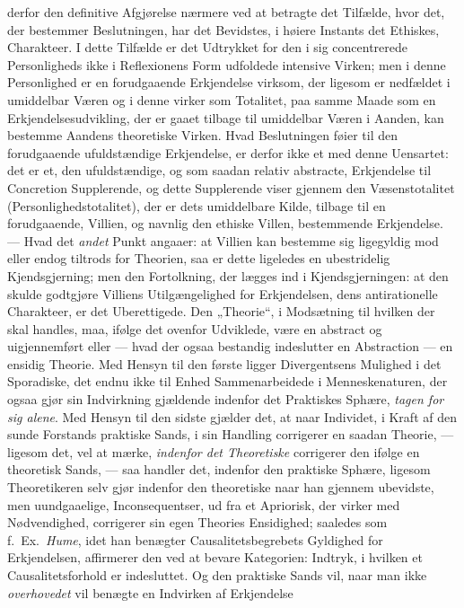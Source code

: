 \documentclass[12pt,a4paper]{book}
\newcommand{\opage}[1]{\marginnote{\footnotesize\textit{[#1]}}}
\begin{document}
derfor den definitive Afgjørelse nærmere ved at betragte det Tilfælde,
hvor det, der bestemmer Beslutningen, har det Bevidstes, i høiere
Instants det Ethiskes, Charakteer. I dette Tilfælde er det Udtrykket
for den i sig concentrerede Personligheds ikke i Reflexionens Form
udfoldede intensive Virken; men i denne Personlighed er en forudgaaende
Erkjendelse virksom, der ligesom er nedfældet i umiddelbar Væren og i
denne virker som Totalitet, paa samme Maade som en
Erkjendelsesudvikling, der er gaaet tilbage til umiddelbar Væren i
Aanden, kan bestemme Aandens theoretiske Virken. Hvad Beslutningen
føier til den forudgaaende ufuldstændige Erkjendelse, er derfor ikke et
med denne Uensartet: det er et, den ufuldstændige, og som saadan
relativ abstracte, Erkjendelse til Concretion Supplerende, og dette
Supplerende viser gjennem den Væsenstotalitet (Personlighedstotalitet),
der er dets umiddelbare Kilde, tilbage til en forudgaaende, Villien, og
navnlig den ethiske Villen, bestemmende Erkjendelse. --- Hvad det \emph{andet} Punkt angaaer: at Villien kan bestemme sig ligegyldig mod eller endog
tiltrods for Theorien, saa er dette ligeledes en ubestridelig
Kjendsgjerning; men den Fortolkning, der lægges ind i
Kjendsgjerningen: at den skulde godtgjøre Villiens Utilgængelighed for
Erkjendelsen, dens antirationelle Charakteer, er det Uberettigede. Den
„Theorie“, i Modsætning til hvilken der skal handles, maa, ifølge det
ovenfor Udviklede, være en abstract og uigjennemført eller --- hvad
der ogsaa bestandig indeslutter en Abstraction --- en ensidig Theorie.
Med Hensyn til den første ligger Divergentsens Mulighed i det
Sporadiske, det endnu ikke til Enhed Sammenarbeidede i Menneskenaturen,
der ogsaa gjør sin Indvirkning gjældende indenfor det Praktiskes Sphære, \emph{tagen for sig alene}. Med Hensyn til den sidste gjælder det, at
naar Individet, i Kraft af den sunde Forstands praktiske Sands, i sin
Handling corrigerer en saadan Theorie, --- ligesom det, vel at mærke,
\emph{indenfor det Theoretiske} corrigerer den ifølge en theoretisk Sands, --- saa handler det, indenfor den praktiske Sphære, ligesom \opage{145}Theoretikeren
selv gjør indenfor den theoretiske naar han gjennem ubevidste, men
uundgaaelige, Inconsequentser, ud fra et Apriorisk, der virker med
Nødvendighed, corrigerer sin egen Theories Ensidighed; saaledes som
f.~Ex.\ \emph{Hume}, idet han benægter Causalitetsbegrebets Gyldighed for
Erkjendelsen, affirmerer den ved at bevare Kategorien: Indtryk, i
hvilken et Causalitetsforhold er indesluttet. Og den praktiske Sands
vil, naar man ikke \emph{overhovedet} vil benægte en Indvirken af Erkjendelse
\end{document}
